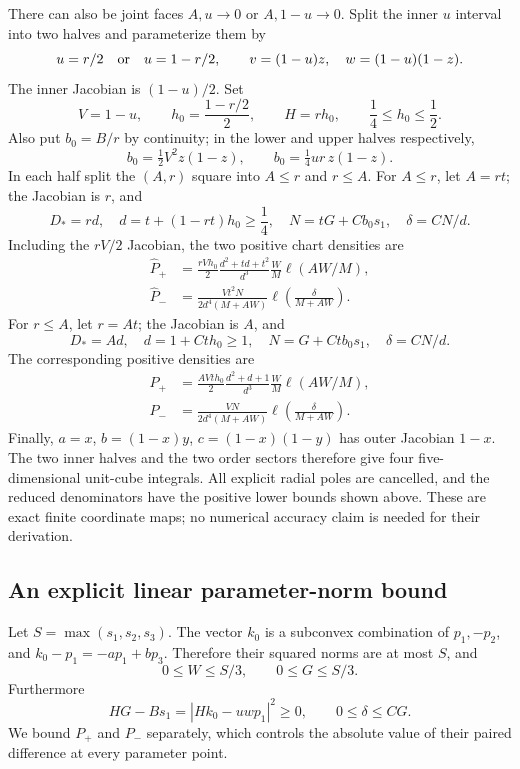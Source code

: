 There can also be joint faces $A,u\to0$ or $A,1-u\to0$. Split the inner
$u$ interval into two halves and parameterize them by
\[
 u=r/2\quad\hbox{or}\quad u=1-r/2,
 \qquad v=(1-u)z,\quad w=(1-u)(1-z).
\]
The inner Jacobian is $(1-u)/2$. Set
\[
 V=1-u,\qquad h_0=\frac{1-r/2}{2},\qquad
 H=rh_0,\qquad \frac14\le h_0\le\frac12.
\]
Also put $b_0=B/r$ by continuity; in the lower and upper halves respectively,
\[
 b_0=\tfrac12V^2z(1-z),\qquad
 b_0=\tfrac14ur\,z(1-z).
\]
In each half split the $(A,r)$ square into $A\le r$ and $r\le A$.
For $A\le r$, let $A=rt$; the Jacobian is $r$, and
\[
 D_*=rd,\quad d=t+(1-rt)h_0\ge\frac14,\quad
 N=tG+Cb_0s_1,\quad \delta=CN/d.
\]
Including the $rV/2$ Jacobian, the two positive chart densities are
\begin{align*}
 \widehat P_+&=\frac{rVh_0}{2}
       \frac{d^2+td+t^2}{d^3}\frac WM\ell(AW/M),\\
 \widehat P_-&=\frac{Vt^2N}{2d^4(M+AW)}
                  \ell\left(\frac{\delta}{M+AW}\right).
\end{align*}
For $r\le A$, let $r=At$; the Jacobian is $A$, and
\[
 D_*=Ad,\quad d=1+Ct h_0\ge1,\quad
 N=G+Ct b_0s_1,\quad\delta=CN/d.
\]
The corresponding positive densities are
\begin{align*}
 \widehat P_+&=\frac{AVt h_0}{2}
       \frac{d^2+d+1}{d^3}\frac WM\ell(AW/M),\\
 \widehat P_-&=\frac{VN}{2d^4(M+AW)}
                  \ell\left(\frac{\delta}{M+AW}\right).
\end{align*}
Finally, $a=x$, $b=(1-x)y$, $c=(1-x)(1-y)$ has outer Jacobian $1-x$.
The two inner halves and the two order sectors therefore give four
five-dimensional unit-cube integrals. All explicit radial poles are
cancelled, and the reduced denominators have the positive lower bounds
shown above. These are exact finite coordinate maps; no numerical accuracy
claim is needed for their derivation.

\subsection{An explicit linear parameter-norm bound}

Let $S=\max(s_1,s_2,s_3)$. The vector $k_0$ is a subconvex combination
of $p_1,-p_2$, and $k_0-p_1=-ap_1+bp_3$. Therefore their squared norms
are at most $S$, and
\[
 0\le W\le S/3,\qquad 0\le G\le S/3.
\]
Furthermore
\[
 HG-Bs_1=|Hk_0-uwp_1|^2\ge0,
 \qquad 0\le\delta\le CG.
\]
We bound $P_+$ and $P_-$ separately, which controls the absolute value of
their paired difference at every parameter point.

